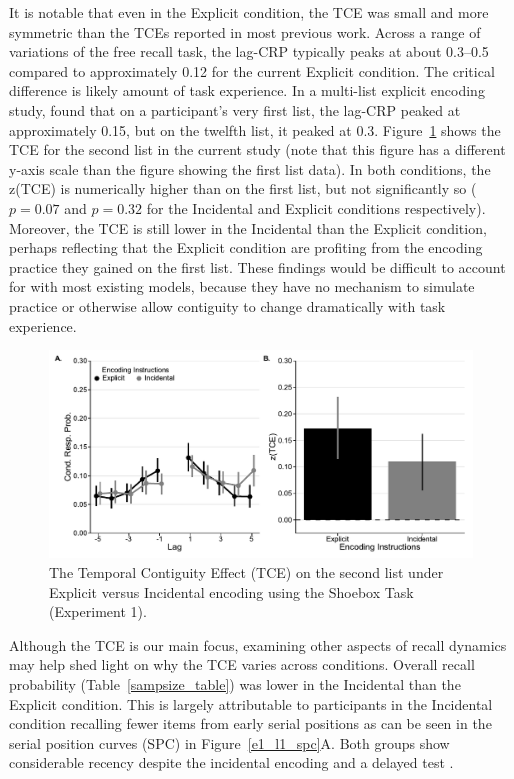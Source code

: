\documentclass[man,natbib,floatsintext]{apa6} %
\begin{document}
\color{red}
\label{TODO-5}
It is notable that even in the Explicit condition, the TCE was small and more symmetric than the TCEs reported in most previous work. Across a range of variations of the free recall task, the lag-CRP typically peaks at about 0.3--0.5 \citep{HealKaha17} compared to approximately 0.12 for the current Explicit condition. The critical difference is likely amount of task experience. In a multi-list explicit encoding study, \citet{HealKaha17} found that on a participant's very first list, the lag-CRP peaked at approximately 0.15, but on the twelfth list, it peaked at 0.3. Figure~\ref{e1_l2_crp} shows the TCE for the second list in the current study (note that this figure has a different y-axis scale than the figure showing the first list data). In both conditions, the z(TCE) is numerically higher than on the first list, but not significantly so ($p=0.07$ and $p=0.32$ for the Incidental and Explicit conditions respectively)\label{t1}. Moreover, the TCE is still lower in the Incidental than the Explicit condition, perhaps reflecting that the Explicit condition are profiting from the encoding practice they gained on the first list. These findings would be difficult to account for with most existing models, because they have no mechanism to simulate practice or otherwise allow contiguity to change dramatically with task experience.

\begin{figure}
\includegraphics{figures/E1_crp_list2.pdf}
\caption{The Temporal Contiguity Effect (TCE) on the second list under Explicit versus Incidental encoding using the Shoebox Task (Experiment 1).\paneltext}
\label{e1_l2_crp}
\end{figure}

\color{black}


\color{red}
\label{TODO-6}
Although the TCE is our main focus, \label{SPCtalk} examining other aspects of recall dynamics may help shed light on why the TCE varies across conditions. Overall recall probability (Table~\ref{sampsize_table}) was lower in the Incidental than the Explicit condition. This is largely attributable to participants in the Incidental condition recalling fewer items from early serial positions as can be seen in the serial position curves (SPC) in Figure~\ref{e1_l1_spc}A. Both groups show considerable recency despite the incidental encoding and a delayed test \citep[for a similar findings, see][]{MarsWerd72,Neat93,GlenEtal80}.
\end{document}
